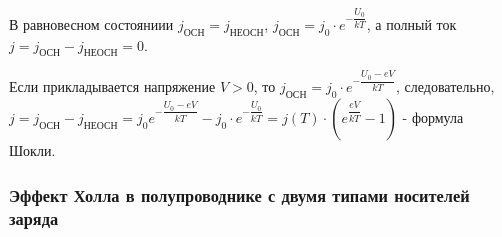 В равновесном состояниии $j_\text{ОСН} = j_\text{НЕОСН}$, $j_\text{ОСН} = j_0 \cdot e^{-\dfrac{U_0}{kT}}$, а полный ток $j = j_\text{ОСН} - j_\text{НЕОСН} = 0$.

Если прикладывается напряжение $V>0$, то $j_\text{ОСН} = j_0 \cdot e^{-\dfrac{U_0-eV}{kT}}$, следовательно, $j = j_\text{ОСН} - j_\text{НЕОСН} = j_0 e^{-\dfrac{U_0-eV}{kT}} - j_0 \cdot e^{-\dfrac{U_0}{kT}} = j(T) \cdot \left( e^{\dfrac{eV}{kT}} - 1 \right) $ - формула Шокли.

\subsubsection{Эффект Холла в полупроводнике с двумя типами носителей заряда}

